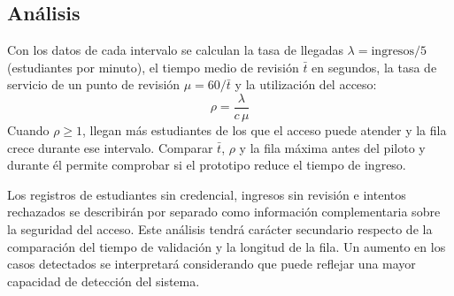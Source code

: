 \subsection{Análisis}
Con los datos de cada intervalo se calculan la tasa de llegadas
$\lambda = \mathrm{ingresos}/5$ (estudiantes por minuto), el tiempo medio de
revisión $\bar{t}$ en segundos, la tasa de servicio de un punto de revisión
$\mu = 60/\bar{t}$ y la utilización del acceso:
\[
	\rho = \frac{\lambda}{c\,\mu}
\]
Cuando $\rho \geq 1$, llegan más estudiantes de los que el acceso puede atender
y la fila crece durante ese intervalo. Comparar $\bar{t}$, $\rho$ y la fila
máxima antes del piloto y durante él permite comprobar si el prototipo reduce
el tiempo de ingreso.

Los registros de estudiantes sin credencial, ingresos sin revisión e intentos
rechazados se describirán por separado como información complementaria sobre
la seguridad del acceso. Este análisis tendrá carácter secundario respecto
de la comparación del tiempo de validación y la longitud de la fila. Un aumento
en los casos detectados se interpretará considerando que puede reflejar una
mayor capacidad de detección del sistema.
